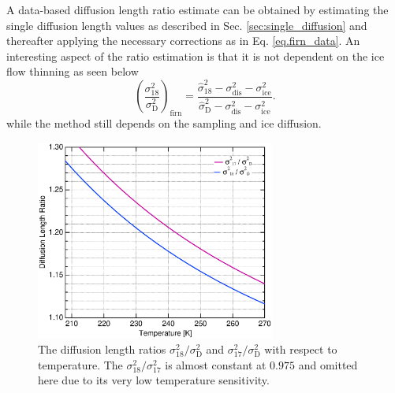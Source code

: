 \documentclass[11pt, draftcls, onecolumn]{IEEEtran} %
\numberwithin{equation}{section}
\numberwithin{table}{section}
\numberwithin{figure}{section}
\begin{document}
A data-based diffusion length ratio estimate can be obtained by estimating the single 
diffusion length values as described in Sec. \ref{sec:single_diffusion}
and thereafter applying the necessary corrections as in Eq. \ref{eq.firn_data}. 
An interesting aspect of the ratio estimation is that it is not dependent on the
ice flow thinning as seen below
\begin{equation} 
\left( \frac{\sigma^2_{18}}{\sigma^2_\mathrm{D}} \right)_{\mathrm{firn}}  =
\frac{ \hat{\sigma}^2_{18} - \sigma^2_{\mathrm{dis}} - \sigma^2_{\mathrm{ice}} }{\hat{\sigma}^2_{\mathrm{D}} - 
	\sigma^2_{\mathrm{dis}} - \sigma^2_{\mathrm{ice}} }.
\end{equation}
while the method still depends on the sampling and ice diffusion.
\begin{figure}[]	
	\vspace*{2mm}	
	\begin{center}		
		\includegraphics[width=0.7\textwidth]{Figure_9}		
		\caption{The diffusion length ratios $\sigma^2_{18}/\sigma^2_{\mathrm{D}}$ and $\sigma^2_{17}/\sigma^2_{\mathrm{D}}$
			with respect to temperature.
			The $\sigma^2_{18}/\sigma^2_{17}$ is almost constant at $0.975$ and omitted here due to its very low temperature sensitivity.} 		
		\label{fig:diff_len_ratio}	
	\end{center}
\end{figure}



\end{document}
